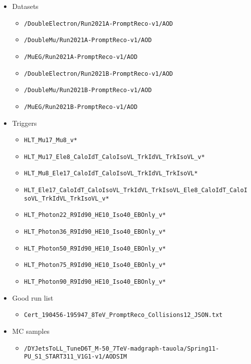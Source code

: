 \begin{itemize}
\item Datasets
  \begin{itemize}
  \item \verb=/DoubleElectron/Run2021A-PromptReco-v1/AOD=
  \item \verb=/DoubleMu/Run2021A-PromptReco-v1/AOD=
  \item \verb=/MuEG/Run2021A-PromptReco-v1/AOD=
  \item \verb=/DoubleElectron/Run2021B-PromptReco-v1/AOD=
  \item \verb=/DoubleMu/Run2021B-PromptReco-v1/AOD=
  \item \verb=/MuEG/Run2021B-PromptReco-v1/AOD=
  \end{itemize}

\item Triggers
  \begin{itemize}
    \item \verb=HLT_Mu17_Mu8_v*=
    \item \verb=HLT_Mu17_Ele8_CaloIdT_CaloIsoVL_TrkIdVL_TrkIsoVL_v*=
    \item \verb=HLT_Mu8_Ele17_CaloIdT_CaloIsoVL_TrkIdVL_TrkIsoVL*=
    \item {\footnotesize \verb=HLT_Ele17_CaloIdT_CaloIsoVL_TrkIdVL_TrkIsoVL_Ele8_CaloIdT_CaloIsoVL_TrkIdVL_TrkIsoVL_v*=}
    \item \verb=HLT_Photon22_R9Id90_HE10_Iso40_EBOnly_v*=
    \item \verb=HLT_Photon36_R9Id90_HE10_Iso40_EBOnly_v*=
    \item \verb=HLT_Photon50_R9Id90_HE10_Iso40_EBOnly_v*=
    \item \verb=HLT_Photon75_R9Id90_HE10_Iso40_EBOnly_v*=
    \item \verb=HLT_Photon90_R9Id90_HE10_Iso40_EBOnly_v*=
  \end{itemize}

\item Good run list
  \begin{itemize}
    \item \verb=Cert_190456-195947_8TeV_PromptReco_Collisions12_JSON.txt=
  \end{itemize}
  
\item MC samples
  \begin{itemize} 
  \item {\footnotesize \verb=/DYJetsToLL_TuneD6T_M-50_7TeV-madgraph-tauola/Spring11-PU_S1_START311_V1G1-v1/AODSIM=}
 \end{itemize}
\end{itemize}

